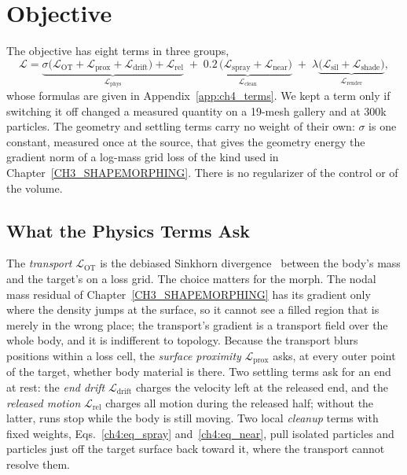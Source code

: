 \section{Objective}
\label{ch4:sec_objective}

The objective has eight terms in three groups,
\begin{equation}
\label{ch4:eq_objective}
\mathcal{L}=\underbrace{\sigma\big(\mathcal{L}_{\mathrm{OT}}+\mathcal{L}_{\mathrm{prox}}+\mathcal{L}_{\mathrm{drift}}\big)
 +\mathcal{L}_{\mathrm{rel}}}_{\mathcal{L}_{\mathrm{phys}}}
 \;+\;\underbrace{0.2\,\big(\mathcal{L}_{\mathrm{spray}}+\mathcal{L}_{\mathrm{near}}\big)}_{\mathcal{L}_{\mathrm{clean}}}
 \;+\;\lambda\underbrace{\big(\mathcal{L}_{\mathrm{sil}}+\mathcal{L}_{\mathrm{shade}}\big)}_{\mathcal{L}_{\mathrm{render}}} ,
\end{equation}
whose formulas are given in Appendix~\ref{app:ch4_terms}. We kept a term only if switching it off changed a measured
quantity on a 19-mesh gallery and at 300k particles. The geometry and settling terms carry no weight of their own: $\sigma$
is one constant, measured once at the source, that gives the geometry energy the gradient norm of a log-mass grid loss of
the kind used in Chapter~\ref{CH3_SHAPEMORPHING}. There is no regularizer of the control or of the volume.

\subsection{What the Physics Terms Ask}
The \emph{transport} $\mathcal{L}_{\mathrm{OT}}$ is the debiased Sinkhorn divergence~\citep{feydy2019sinkhorn} between the
body's mass and the target's on a loss grid. The choice matters for the morph. The nodal mass residual of
Chapter~\ref{CH3_SHAPEMORPHING} has its gradient only where the density jumps at the surface, so it cannot see a filled
region that is merely in the wrong place; the transport's gradient is a transport field over the whole body, and it is
indifferent to topology. Because the transport blurs positions within a loss cell, the \emph{surface proximity}
$\mathcal{L}_{\mathrm{prox}}$ asks, at every outer point of the target, whether body material is there. Two settling terms
ask for an end at rest: the \emph{end drift} $\mathcal{L}_{\mathrm{drift}}$ charges the velocity left at the released end,
and the \emph{released motion} $\mathcal{L}_{\mathrm{rel}}$ charges all motion during the released half; without the
latter, runs stop while the body is still moving. Two local \emph{cleanup} terms with fixed weights,
Eqs.~\eqref{ch4:eq_spray} and~\eqref{ch4:eq_near}, pull isolated particles and particles just off the target surface back
toward it, where the transport cannot resolve them.

